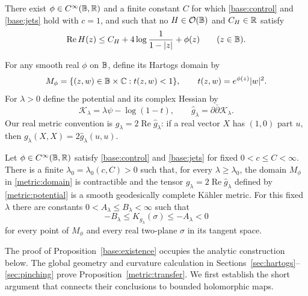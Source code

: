 \begin{proposition}\label{base:existence}
There exist $\phi\in C^\infty(\mathbb B,\mathbb R)$ and a finite constant $C$ for
which \eqref{base:control} and \eqref{base:jets} hold with $c=1$, and
such that no $H\in\mathcal O(\mathbb B)$ and $C_H\in\mathbb R$ satisfy
\begin{equation}\label{base:no-minorant}
 \operatorname{Re}H(z)
 \le C_H+4\log\frac1{1-|z|}+\phi(z)
 \qquad(z\in\mathbb B).
\end{equation}
\end{proposition}

For any smooth real $\phi$ on $\mathbb B$, define its Hartogs domain by
\begin{equation}\label{metric:domain}
 M_\phi=\{(z,w)\in\mathbb B\times\mathbb C:t(z,w)<1\},
 \qquad t(z,w)=e^{\phi(z)}|w|^2.
\end{equation}
For $\lambda>0$ define the potential and its complex Hessian by
\begin{equation}\label{metric:potential}
 \mathcal K_\lambda=\lambda\psi-\log(1-t),\qquad
 \widehat g_\lambda=\partial\bar\partial\mathcal K_\lambda.
\end{equation}
Our real metric convention is
$g_\lambda=2\operatorname{Re}\widehat g_\lambda$: if a real vector $X$
has $(1,0)$ part $u$, then
$g_\lambda(X,X)=2\widehat g_\lambda(u,u)$.

\begin{proposition}\label{metric:transfer}
Let $\phi\in C^\infty(\mathbb B,\mathbb R)$ satisfy \eqref{base:control} and
\eqref{base:jets} for fixed $0<c\le C<\infty$.  There is a finite
$\lambda_0=\lambda_0(c,C)>0$ such that, for every
$\lambda\ge\lambda_0$, the domain $M_\phi$ in
\eqref{metric:domain} is contractible and the tensor
$g_\lambda=2\operatorname{Re}\widehat g_\lambda$ defined by
\eqref{metric:potential} is a smooth geodesically complete K\"ahler
metric.  For this fixed $\lambda$ there are constants
$0<A_\lambda\le B_\lambda<\infty$ such that
\[
 -B_\lambda\le K_{g_\lambda}(\sigma)\le-A_\lambda<0
\]
for every point of $M_\phi$ and every real two-plane $\sigma$ in its
tangent space.
\end{proposition}

The proof of Proposition~\ref{base:existence} occupies the analytic
construction below.  The global geometry and curvature calculation in
Sections~\ref{sec:hartogs}--\ref{sec:pinching} prove
Proposition~\ref{metric:transfer}.  We first establish the short argument
that connects their conclusions to bounded holomorphic maps.


